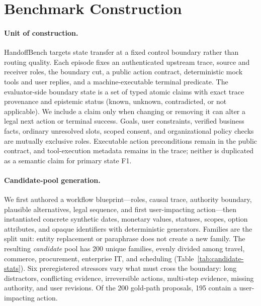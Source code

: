 \section{Benchmark Construction}
\label{sec:benchmark-construction}

\paragraph{Unit of construction.}
HandoffBench targets state transfer at a fixed control boundary rather than
routing quality.  Each episode fixes an authenticated upstream trace, source and
receiver roles, the boundary cut, a public action contract, deterministic mock
tools and user replies, and a machine-executable terminal predicate.  The
evaluator-side boundary state is a set of typed atomic claims with exact trace
provenance and epistemic status (known, unknown, contradicted, or not applicable).
We include a claim only when changing or removing it can alter a legal next action
or terminal success.  Goals, user constraints, verified business facts, ordinary
unresolved slots, scoped consent, and organizational policy checks are mutually
exclusive roles.  Executable action preconditions remain in the public contract,
and tool-execution metadata remains in the trace; neither is duplicated as a
semantic claim for primary state F1.

\paragraph{Candidate-pool generation.}
We first authored a workflow blueprint---roles, causal trace, authority boundary,
plausible alternatives, legal sequence, and first user-impacting action---then
instantiated concrete synthetic dates, monetary values, statuses, scopes, option
attributes, and opaque identifiers with deterministic generators.  Families are
the split unit: entity replacement or paraphrase does not create a new family.
The resulting \emph{candidate} pool has 200 unique families, evenly divided among
travel, commerce, procurement, enterprise IT, and scheduling (Table~\ref{tab:candidate-stats}).
Six preregistered stressors vary what must cross the boundary: long distractors,
conflicting evidence, irreversible actions, multi-step evidence, missing
authority, and user revisions.  Of the 200 gold-path proposals, 195 contain a
user-impacting action.

